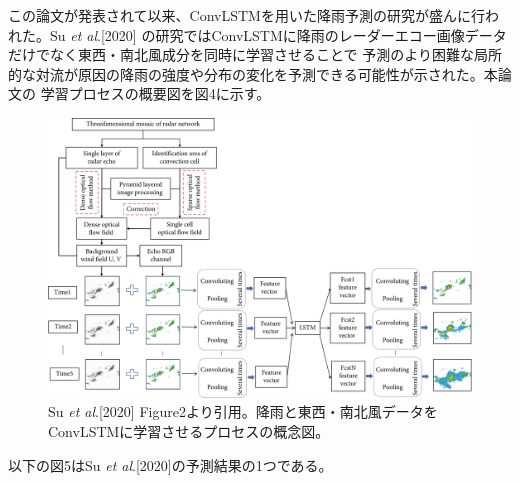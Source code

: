 この論文が発表されて以来、ConvLSTMを用いた降雨予測の研究が盛んに行われた。Su \textit{et al}.[2020]
の研究ではConvLSTMに降雨のレーダーエコー画像データだけでなく東西・南北風成分を同時に学習させることで
予測のより困難な局所的な対流が原因の降雨の強度や分布の変化を予測できる可能性が示された。本論文の
学習プロセスの概要図を図4に示す。

\begin{figure}[H]
\begin{center}
\includegraphics[width=0.8\linewidth]{fig/intro/su-et-al-flowchart.png}
\caption{Su \textit{et al}.[2020] Figure2より引用。降雨と東西・南北風データをConvLSTMに学習させるプロセスの概念図。}
\end{center}
\end{figure}

以下の図5はSu \textit{et al}.[2020]の予測結果の1つである。

